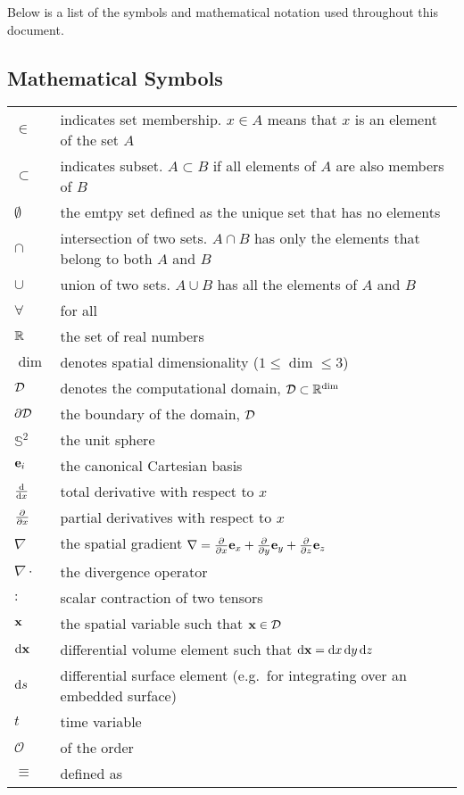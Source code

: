\documentclass[../doc.tex]{subfiles}
\begin{document}
\renewcommand{\arraystretch}{1.1}
Below is a list of the symbols and mathematical notation used throughout this document. 

\subsection*{Mathematical Symbols}
\begin{longtable}{p{2cm}p{12cm}}
$\in$ & indicates set membership. $x \in A$ means that $x$ is an element of the set $A$\\
$\subset$ & indicates subset. $A \subset B$ if all elements of $A$ are also members of $B$ \\
$\emptyset$ & the emtpy set defined as the unique set that has no elements \\
$\cap$ & intersection of two sets. $A\cap B$ has only the elements that belong to both $A$ and $B$ \\
$\cup$ & union of two sets. $A\cup B$ has all the elements of $A$ and $B$ \\
$\forall$ & for all \\
$\mathbb{R}$ & the set of real numbers \\
$\dim$ & denotes spatial dimensionality ($1\leq \dim \leq 3$) \\
$\mathcal{D}$ & denotes the computational domain, $\mathcal{D} \subset \mathbb{R}^{\dim}$\\ 
$\partial\mathcal{D}$ & the boundary of the domain, $\mathcal{D}$ \\
$\mathbb{S}^2$ & the unit sphere \\
$\boldsymbol{\mathrm{e}}_i$ & the canonical Cartesian basis \\
$\frac{\mathop{}\!\mathrm{d} }{\mathop{}\!\mathrm{d} x}$ & total derivative with respect to $x$ \\
$\frac{\partial }{\partial x}$ & partial derivatives with respect to $x$ \\
$\nabla$ & the spatial gradient $\nabla = \frac{\partial }{\partial x} \boldsymbol{\mathrm{e}}_x + \frac{\partial }{\partial y}\boldsymbol{\mathrm{e}}_y + \frac{\partial }{\partial z}\boldsymbol{\mathrm{e}}_z$ \\
$\nabla\cdot$ & the divergence operator \\
$:$ & scalar contraction of two tensors \\
$\boldsymbol{\mathrm{x}}$ & the spatial variable such that $\boldsymbol{\mathrm{x}} \in \mathcal{D}$ \\
$\mathop{}\!\mathrm{d}\boldsymbol{\mathrm{x}}$ & differential volume element such that $\mathop{}\!\mathrm{d}\boldsymbol{\mathrm{x}} = \mathop{}\!\mathrm{d} x \mathop{}\!\mathrm{d} y \mathop{}\!\mathrm{d} z$ \\ 
$\mathop{}\!\mathrm{d} s$ & differential surface element (e.g.~for integrating over an embedded surface) \\
$t$ & time variable \\
$\mathcal{O}$ & of the order \\
$\equiv$ & defined as \\
\end{longtable}
\end{document}
